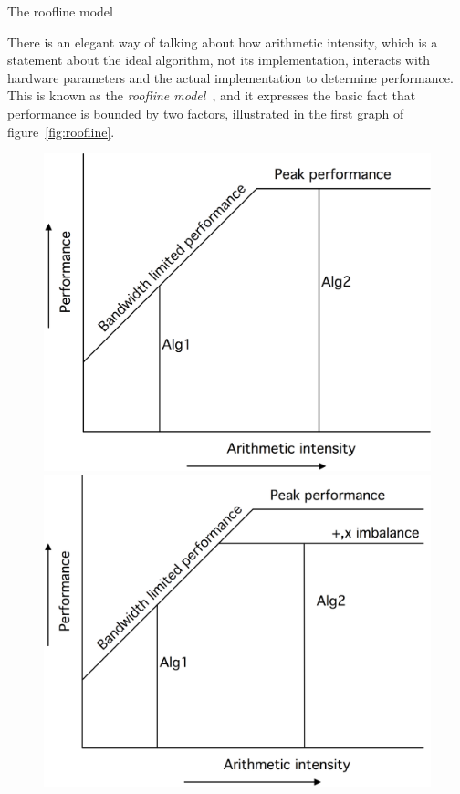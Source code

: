  {The roofline model}
\label{sec:roofline}

There is an elegant way of talking about how arithmetic intensity,
which is a statement about the ideal algorithm, not its implementation,
interacts with hardware parameters and the actual implementation
to determine performance.
This is known as the \emph{roofline model}~\cite{Williams:2009:roofline},
and it expresses the basic fact that performance is bounded by two factors,
illustrated in the first graph of figure~\ref{fig:roofline}.
\begin{figure}[p]

  \includegraphics[scale=.1]{graphics/roofline1}
  \includegraphics[scale=.1]{graphics/roofline2}

\end{figure}
